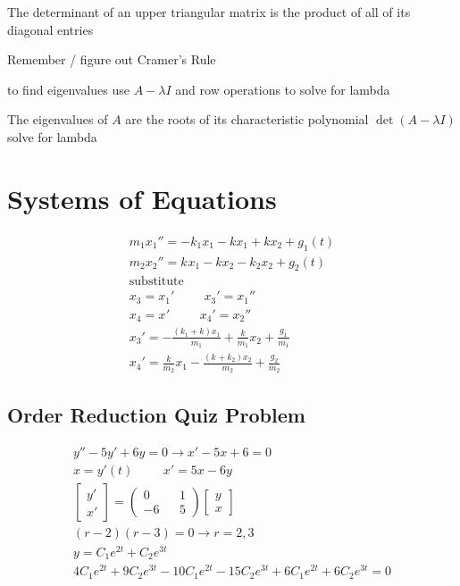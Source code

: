 \documentclass[fleqn]{report}
\newcommand{\hp}{\hspace{1cm}}
\newcommand{\equations} [1] {
\begin{gather*}
#1
\end{gather*}
}
\begin{document}
The determinant of an upper triangular matrix is the product of all of its diagonal entries

Remember / figure out Cramer's Rule

to find eigenvalues use $A - \lambda I$ and row operations to solve for lambda

The eigenvalues of $A$ are the roots of its characteristic polynomial $\det (A - \lambda I)$ solve for lambda

\chapter{Systems of Equations}

\equations{
m_{1} x_{1}'' = -k_{1}x_{1} - kx_{1} + kx_{2} + g_{1}(t) 
\\
m_{2} x_{2}'' = k_{}x_{1} - kx_{2} - k_{2}x_{2} + g_{2}(t) 
\\
\textrm{substitute}
\\
x_{3} = x_{1}' \hp x_{3}' = x_{1}'' 
\\
x_{4} = x_{}' \hp x_{4}' = x_{2}'' 
\\
x_{3}' = - \frac{(k_{1} + k) x_{1}}{m_{1}} + \frac{k}{m_{1}}x_{2} + \frac{g_{1}}{m_{1}}
\\
x_{4}' = \frac{k}{m_{2}}x_{1}- \frac{(k_{} + k_{2}) x_{2}}{m_{2}}  + \frac{g_{2}}{m_{2}}
}

\section{Order Reduction Quiz Problem}
\equations{
y'' - 5y' + 6y = 0
\rightarrow
x' - 5x + 6 = 0
\\
x = y'(t) \hp x' =  5x - 6y
\\
\begin{bmatrix}
y' \\ x' 
\end{bmatrix}
=
\begin{pmatrix}
0 && 1 \\
-6 && 5
\end{pmatrix}
\begin{bmatrix}
y \\ x
\end{bmatrix}
\\
(r - 2)(r - 3) = 0 \rightarrow r = 2, 3
\\
y = C_1 e^{2t} + C_2 e^{3t}
\\
4C_1 e^{2t} + 9C_2 e^{3t} - 10 C_1 e^{2t} - 15 C_2 e^{3t} + 6C_1 e^{2t} + 6C_2 e^{3t} = 0
}
\end{document}
